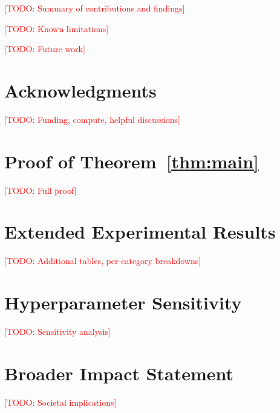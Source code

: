 \documentclass[11pt,a4paper]{article}
\newcommand{\todo}[1]{\textcolor{red}{[TODO: #1]}}
\begin{document}
\todo{Summary of contributions and findings}

\todo{Known limitations}

\todo{Future work}

\section*{Acknowledgments}
\todo{Funding, compute, helpful discussions}




\appendix

\section{Proof of Theorem~\ref{thm:main}}
\label{app:proof}
\todo{Full proof}

\section{Extended Experimental Results}
\label{app:results}
\todo{Additional tables, per-category breakdowns}

\section{Hyperparameter Sensitivity}
\label{app:hyperparams}
\todo{Sensitivity analysis}

\section{Broader Impact Statement}
\label{app:impact}
\todo{Societal implications}
\end{document}
